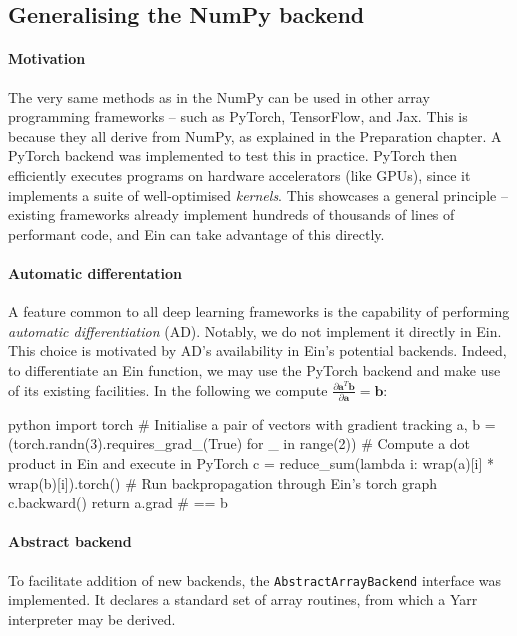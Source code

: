 \subsection{Generalising the NumPy backend}

\paragraph{Motivation} The very same methods as in the NumPy can be used in other array programming frameworks -- such as PyTorch, TensorFlow, and Jax. This is because they all derive from NumPy, as explained in the Preparation chapter. A PyTorch backend was implemented to test this in practice. PyTorch then efficiently executes programs on hardware accelerators (like GPUs), since it implements a suite of well-optimised \textit{kernels}. This showcases a general principle -- existing frameworks already implement hundreds of thousands of lines of performant code, and Ein can take advantage of this directly.

\paragraph{Automatic differentation} A feature common to all deep learning frameworks is the capability of performing \textit{automatic differentiation} (AD). Notably, we do not implement it directly in Ein. This choice is motivated by AD's availability in Ein's potential backends. Indeed, to differentiate an Ein function, we may use the PyTorch backend and make use of its existing facilities. In the following we compute $\frac{\partial \mathbf{a}^T \mathbf{b}}{\partial \mathbf{a}} = \mathbf{b}$:
\begin{center}
\begin{cminted}{python}
import torch
# Initialise a pair of vectors with gradient tracking
a, b = (torch.randn(3).requires_grad_(True) for _ in range(2))
# Compute a dot product in Ein and execute in PyTorch
c = reduce_sum(lambda i: wrap(a)[i] * wrap(b)[i]).torch()
# Run backpropagation through Ein's torch graph
c.backward()
return a.grad  # == b
\end{cminted}
\end{center}

\paragraph{Abstract backend} To facilitate addition of new backends, the \texttt{AbstractArrayBackend} interface was implemented. It declares a standard set of array routines, from which a Yarr interpreter may be derived.

